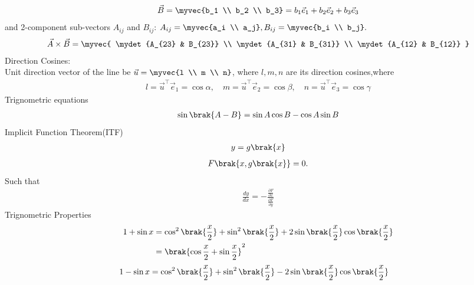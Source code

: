 \begin{enumerate}[label=\thesubsection.\arabic*, ref=\thesubsection.\theenumi]
		\begin{align}
			\vec{B} =  \myvec{b_1 \\ b_2 \\ b_3}=b_1 \vec{e}_1 + b_2 \vec{e}_2 + b_3 \vec{e}_3
		\end{align}
		and 2-component sub-vectors $A_{ij}$ and $B_{ij}$:
		$A_{ij} =\myvec{a_i \\ a_j},B_{ij} = \myvec{b_i \\ b_j}.$
		\begin{align}
			\vec{A} \times \vec{B} = \myvec{
				\mydet{A_{23} & B_{23}}  \\
				\mydet{A_{31} & B_{31}}  \\
				\mydet{A_{12} & B_{12}}
		}\label{eq:cross}
		\end{align}
			Direction Cosines:\\
			Unit direction vector of the line be $\vec{u} = \myvec{l \\ m \\ n}$, where $l, m, n$ are its direction cosines,where
			\begin{align}
				l = \vec{u}^{\top} \vec{e}_1 = \cos\alpha, \quad m = \vec{u}^{\top} \vec{e}_2 = \cos\beta, \quad n = \vec{u}^{\top} \vec{e}_3 = \cos\gamma \label{eq:cross1}
			\end{align}
			Trignometric equations
			\begin{align}
				\sin\brak{A - B} = \sin A \cos B - \cos A \sin B \label{sinsub}
				\end{align}
				Implicit Function Theorem(ITF)			
				\begin{align}
					y = g\brak{x}  
					\end{align}
					\begin{align}
					F\brak{x, g\brak{x}} = 0.  \label{ITF1}
						\end{align}
						Such that
						\begin{align}
						\frac{dy}{dx} = -\frac{\frac{\partial F}{\partial x}}{\frac{\partial F}{\partial y}} \label{ITF2}
						\end{align}
	Trignometric Properties
\begin{align}
	1 + \sin x &= \cos^2\brak{\frac{x}{2}} + \sin^2\brak{\frac{x}{2}} + 2\sin\brak{\frac{x}{2}}\cos\brak{\frac{x}{2}}
	\\
	&= \brak{\cos\frac{x}{2} + \sin\frac{x}{2}}^2
	\label{eq:EE26BTECH11202-plus_sin_decomp}
\end{align}
\begin{align}
	1 - \sin x &= \cos^2\brak{\frac{x}{2}} + \sin^2\brak{\frac{x}{2}} - 2\sin\brak{\frac{x}{2}}\cos\brak{\frac{x}{2}}

\end{align}
\end{enumerate}

